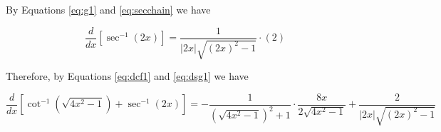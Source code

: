 \documentclass{article}
\newcommand{\ddx}[1]{\frac{d}{dx}\left[#1\right]}
\newcommand{\newp}{\hrulefill \vskip 1cm}
\begin{document}
By Equations \eqref{eq:g1} and \eqref{eq:secchain} we have

\begin{equation}\label{eq:dsg1}
    \ddx{\sec^{-1}(2x)}=\dfrac{1}{|2x|\sqrt{\left(2x\right)^2-1}}\cdot (2)
\end{equation}

Therefore, by Equations \eqref{eq:dcf1} and \eqref{eq:dsg1} we have

\[
\ddx{\cot^{-1}\left( \sqrt{4x^2-1} \right)+\sec^{-1}(2x)}=-\dfrac{1}{\left(\sqrt{4x^2-1}\right)^2+1}\cdot \dfrac{8x}{2\sqrt{4x^2-1}}+\dfrac{2}{|2x|\sqrt{\left(2x\right)^2-1}}
\]
\newp
\end{document}
